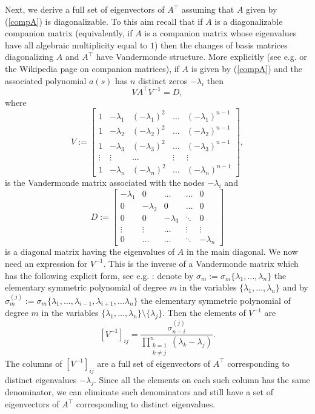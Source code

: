 \documentclass[10pt,a4paper]{amsart}
\newcommand{\tp}{^{\top}}
\def\bmat{\left[ \begin{array}}
\def\emat{\end{array} \right]}
\begin{document}
Next, we derive a full set of eigenvectors of $A\tp$ assuming that $A$ given by (\ref{compA}) is diagonalizable. To this aim recall that if $A$ is a diagonalizable companion matrix (equivalently, if  $A$ is a  companion matrix whose eigenvalues have all algebraic multiplicity equal to $1$) then the changes of basis matrices diagonalizing $A$ and $A\tp$ 
have Vandermonde structure.
More explicitly (see e.g.\cite{turnbull1961introduction} or the Wikipedia page on companion matrices), if $A$ is given by (\ref{compA}) and the associated polynomial $a(s)$ has $n$ distinct zeros $-\lambda_i$  
then
$$
VA\tp V^{-1} = D,
$$
where 
$$
V:=\bmat{cccccc}
1&-\lambda_1 &(-\lambda_1)^2 &\dots &(-\lambda_1)^{n-1}\\
1&-\lambda_2 &(-\lambda_2)^2 &\dots &(-\lambda_2)^{n-1}\\
1&-\lambda_3 &(-\lambda_3)^2 &\dots &(-\lambda_3)^{n-1}\\
\vdots&\vdots&\dots&\vdots&\vdots\\
1&-\lambda_n &(-\lambda_n)^2 &\dots &(-\lambda_n)^{n-1}
\emat, $$
is the Vandermonde matrix associated with the nodes $-\lambda_i$ and
$$D:= \bmat{cccccc}
-\lambda_1 &0 &\dots&\dots &0\\
0&-\lambda_2 &0 &\dots &0\\
0&0&-\lambda_3 &\ddots &0\\
\vdots&\vdots&\dots&\vdots&\vdots\\
0&\dots & \dots&\ddots &-\lambda_n
\emat
$$
is a diagonal matrix having the eigenvalues of $A$ in the main diagonal.
We now need an expression for $V^{-1}$. This is the inverse of a Vandermonde matrix 
which has the following explicit form, see e.g. \cite{EISINBERG20061384}:
denote by $\sigma_{m}:=\sigma_{m}\{\lambda_1, \dots, \lambda_n\}$
the  elementary symmetric polynomial of degree $m$
in the variables $\{\lambda_1, \dots, \lambda_n\}$ and by
$\sigma_{m}^{(j)}:=\sigma_{m}\{\lambda_1, \dots,\lambda_{i-1},\lambda_{i+1},\dots \lambda_n\}$
the  elementary symmetric polynomial of degree $m$
in the variables $\{\lambda_1, \dots, \lambda_n\} \setminus \{\lambda_j\}$. Then the elements of $V^{-1}$ are
\begin{equation}\label{eigvinv}
[V^{-1}]_{ij} = \frac{\sigma_{n-i}^{(j)}}{\prod_{\substack{k=1 \\ k \neq j}}^n (\lambda_k - \lambda_j)}.
\end{equation}
The columns of $[V^{-1}]_{ij}$ are a full set of eigenvectors of $A\tp$ corresponding to distinct eigenvalues
$-\lambda_j$. Since all the elements on each such column has the same denominator, we can eliminate such denominators and still have a set of eigenvectors of $A\tp$ corresponding to distinct eigenvalues.
\end{document}
